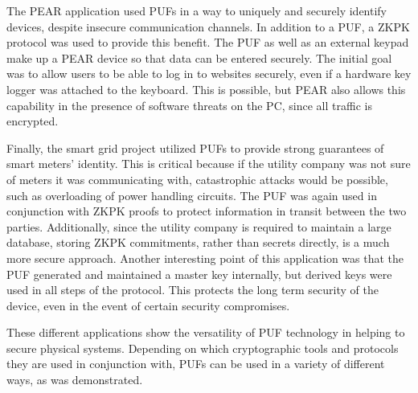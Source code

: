 The PEAR application used PUFs in a way to uniquely and securely identify devices, despite insecure communication
channels. In addition to a PUF, a ZKPK protocol was used to provide this benefit. The PUF as well as an external keypad
make up a PEAR device so that data can be entered securely. The initial goal was to allow users to be able to log in
to websites securely, even if a hardware key logger was attached to the keyboard. This is possible, but PEAR also
allows this capability in the presence of software threats on the PC, since all traffic is encrypted.

Finally, the smart grid project utilized PUFs to provide strong guarantees of smart meters' identity. This is critical
because if the utility company was not sure of meters it was communicating with, catastrophic attacks would be possible,
such as overloading of power handling circuits. The PUF was again used in conjunction with ZKPK proofs to
protect information in transit between the two parties. Additionally, since the utility company is required to maintain
a large database, storing ZKPK commitments, rather than secrets directly, is a much more secure approach. Another
interesting point of this application was that the PUF generated and maintained a master key internally, 
but derived keys were used in all steps of the protocol. This protects the long term security of the device, even in the 
event of certain security compromises.

These different applications show the versatility of PUF technology in helping to secure physical systems.
Depending on which cryptographic tools and protocols they are used in conjunction with, PUFs can be used
in a variety of different ways, as was demonstrated.